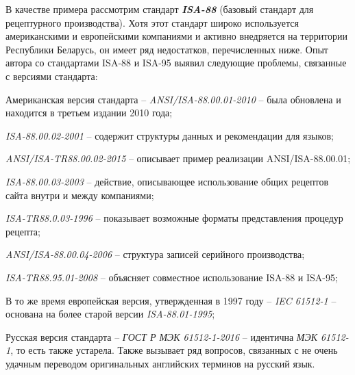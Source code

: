 В качестве примера рассмотрим стандарт \textbf{\textit{ISA-88}} \cite{ISA88} (базовый стандарт для рецептурного производства). Хотя этот стандарт широко используется американскими и европейскими компаниями и активно внедряется на территории Республики Беларусь, он имеет ряд недостатков, перечисленных ниже. Опыт автора со стандартами ISA-88 и ISA-95 выявил следующие проблемы, связанные с версиями стандарта:
\begin{textitemize}
    \item Американская версия стандарта -- \textit{ANSI/ISA-88.00.01-2010} -- была обновлена и находится в третьем издании 2010 года;
    \item \textit{ISA-88.00.02-2001} – содержит структуры данных и рекомендации для языков;
    \item \textit{ANSI/ISA-TR88.00.02-2015} -- описывает пример реализации ANSI/ISA-88.00.01;
    \item \textit{ISA-88.00.03-2003} -- действие, описывающее использование общих рецептов сайта внутри и между компаниями;
    \item \textit{ISA-TR88.0.03-1996} -- показывает возможные форматы представления процедур рецепта;
    \item \textit{ANSI/ISA-88.00.04-2006} -- структура записей серийного производства;
    \item \textit{ISA-TR88.95.01-2008} -- объясняет совместное использование ISA-88 и ISA-95;
    \item В то же время европейская версия, утвержденная в 1997 году -- \textit{IEC 61512-1} -- основана на более старой версии \textit{ISA-88.01-1995};
    \item Русская версия стандарта -- \textit{ГОСТ Р МЭК 61512-1-2016} -- идентична \textit{МЭК 61512-1}, то есть также устарела. Также вызывает ряд вопросов, связанных с не очень удачным переводом оригинальных английских терминов на русский язык.
\end{textitemize}

